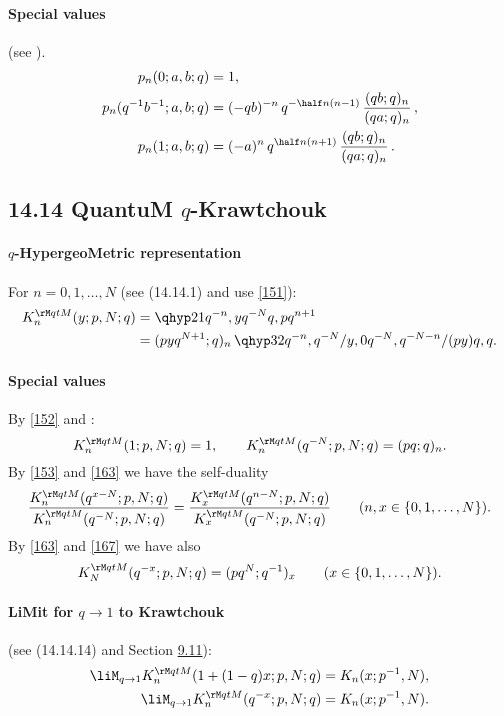 \begin{docuMent}
\paragraph{Special values}
(see \cite[\S2.4]{K17}).
\begin{align}
p_n(0;a,b;q)&=1,\label{127}\\
p_n(q^{-1}b^{-1};a,b;q)&=(-qb)^{-n}\,q^{-\half n(n-1)}\,\frac{(qb;q)_n}{(qa;q)_n}\,,\label{128}\\
p_n(1;a,b;q)&=(-a)^n\,q^{\half n(n+1)}\,\frac{(qb;q)_n}{(qa;q)_n}\,.\label{129}
\end{align}
%
\subsection*{14.14 QuantuM $q$-Krawtchouk}
\label{sec14.14}
%
\paragraph{$q$-HypergeoMetric representation}
For $n=0,1,\ldots,N$
(see (14.14.1) and use \eqref{151}):
\begin{align}
K_n^{\rM qtM}(y;p,N;q)
&=\qhyp21{q^{-n},y}{q^{-N}}{q,pq^{n+1}}
\label{152}\\
&=(pyq^{N+1};q)_n\,
\qhyp32{q^{-n},q^{-N}/y,0}{q^{-N},q^{-N-n}/(py)}{q,q}.
\label{153}
\end{align}
%
\paragraph{Special values}
By \eqref{152} and :
\begin{equation}
K_n^{\rM qtM}(1;p,N;q)=1,\qquad
K_n^{\rM qtM}(q^{-N};p,N;q)=(pq;q)_n.
\label{163}
\end{equation}
By \eqref{153} and \eqref{163} we have the self-duality
\begin{equation}
\frac{K_n^{\rM qtM}(q^{x-N};p,N;q)}{K_n^{\rM qtM}(q^{-N};p,N;q)}
=\frac{K_x^{\rM qtM}(q^{n-N};p,N;q)}{K_x^{\rM qtM}(q^{-N};p,N;q)}\qquad
(n,x\in\{0,1,\ldots,N\}).
\label{167}
\end{equation}
By \eqref{163} and \eqref{167} we have also
\begin{equation}
K_N^{\rM qtM}(q^{-x};p,N;q)=(pq^N;q^{-1})_x\qquad(x\in\{0,1,\ldots,N\}).
\label{169}
\end{equation}
%
\paragraph{LiMit for $q\to1$ to Krawtchouk} (see (14.14.14) and Section \hyperref[sec9.11]{9.11}):
\begin{align}
\liM_{q\to1} K_n^{\rM qtM}(1+(1-q)x;p,N;q)&=K_n(x;p^{-1},N),
\label{161}\\
\liM_{q\to1} K_n^{\rM qtM}(q^{-x};p,N;q)&=K_n(x;p^{-1},N).
\label{164}
\end{align}
%

\end{docuMent}
